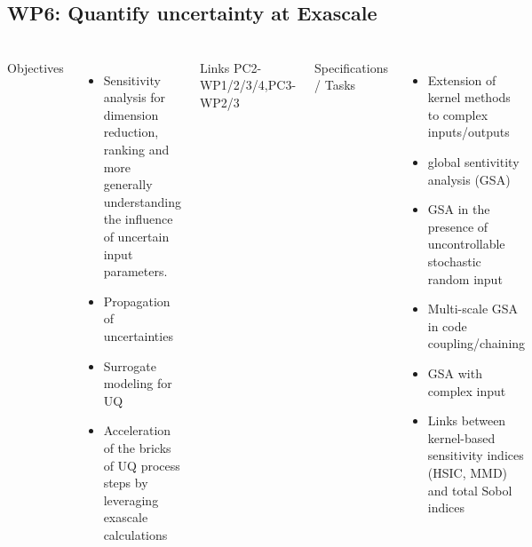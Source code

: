 \subsection{WP6: Quantify uncertainty at Exascale}
\begin{frame}
  \frametitle{\insertsectionhead}
  \framesubtitle{\insertsubsectionhead}
  \footnotesize
  \begin{columns}
    Objectives
    \begin{itemize}
      \item Sensitivity analysis for dimension reduction, ranking and more generally understanding the influence of uncertain input parameters.
       \item  Propagation of uncertainties
      \item Surrogate modeling for UQ
      \item Acceleration of the bricks of UQ process steps by leveraging exascale calculations
    \end{itemize}

    \begin{alertblock}{Links}
      PC2-WP1/2/3/4,PC3-WP2/3
    \end{alertblock}
    Specifications / Tasks
      \begin{itemize}
        \item Extension of kernel methods to complex inputs/outputs
        \item global sentivitity analysis (GSA) 
        \item  GSA in the presence of uncontrollable stochastic random input
        \item Multi-scale GSA in code coupling/chaining
        \item GSA with complex input 
        \item  Links between kernel-based sensitivity indices (HSIC, MMD) and total Sobol indices
      \end{itemize}


  \end{columns}
\end{frame}

